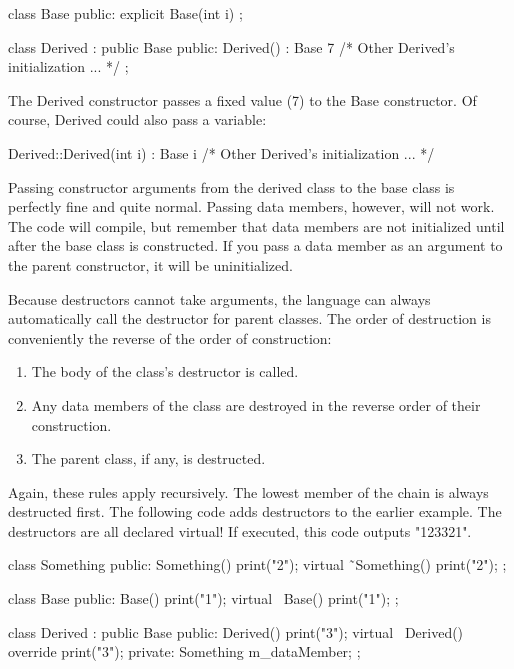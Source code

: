 \begin{cpp}
class Base
{
    public:
        explicit Base(int i) {}
};

class Derived : public Base
{
    public:
        Derived() : Base { 7 } { /* Other Derived's initialization ... */ }
};
\end{cpp}

The Derived constructor passes a fixed value (7) to the Base constructor. Of course, Derived could also pass a variable:

\begin{cpp}
Derived::Derived(int i) : Base { i } { /* Other Derived's initialization ... */ }
\end{cpp}

Passing constructor arguments from the derived class to the base class is perfectly fine and quite normal. Passing data members, however, will not work. The code will compile, but remember that data members are not initialized until after the base class is constructed. If you pass a data member as an argument to the parent constructor, it will be uninitialized.


Because destructors cannot take arguments, the language can always automatically call the destructor for parent classes. The order of destruction is conveniently the reverse of the order of construction:

\begin{enumerate}
\item
The body of the class’s destructor is called.

\item
Any data members of the class are destroyed in the reverse order of their construction.

\item
The parent class, if any, is destructed.
\end{enumerate}

Again, these rules apply recursively. The lowest member of the chain is always destructed first. The following code adds destructors to the earlier example. The destructors are all declared virtual! If executed, this code outputs "123321".

\begin{cpp}
class Something
{
    public:
        Something() { print("2"); }
        virtual ˜Something() { print("2"); }
};

class Base
{
    public:
        Base() { print("1"); }
        virtual ~Base() { print("1"); }
};

class Derived : public Base
{
    public:
        Derived() { print("3"); }
        virtual ~Derived() override { print("3"); }
    private:
        Something m_dataMember;
};
\end{cpp}

